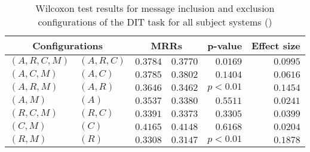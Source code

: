 
\begin{table}
\begin{spacing}{1.2}
\centering
\caption{Wilcoxon test results for message inclusion and exclusion configurations of the DIT task for all subject systems (\ctwo)}
\label{table:versus-wilcox-all-dit-message}
\begin{tabular}{ll|rr|rr}
\toprule
      \multicolumn{2}{c|}{Configurations} &                \multicolumn{2}{c|}{MRRs} &             p-value & Effect size \\
\midrule
 $(A,R,C,M)$ &  $(A,R,C)$ &  $\bm{0.3784}$ &       $0.3770$ & $0.0169$ &    $0.0995$ \\
   $(A,C,M)$ &    $(A,C)$ &       $0.3785$ &  $\bm{0.3802}$ & $0.1404$ &    $0.0616$ \\
   $(A,R,M)$ &    $(A,R)$ &  $\bm{0.3646}$ &       $0.3462$ & $p<0.01$ &    $0.1454$ \\
     $(A,M)$ &      $(A)$ &  $\bm{0.3537}$ &       $0.3380$ & $0.5511$ &    $0.0241$ \\
   $(R,C,M)$ &    $(R,C)$ &  $\bm{0.3391}$ &       $0.3373$ & $0.3305$ &    $0.0399$ \\
     $(C,M)$ &      $(C)$ &  $\bm{0.4165}$ &       $0.4148$ & $0.6168$ &    $0.0204$ \\
     $(R,M)$ &      $(R)$ &  $\bm{0.3308}$ &       $0.3147$ & $p<0.01$ &    $0.1878$ \\
\bottomrule
\end{tabular}

\end{spacing}
\end{table}


